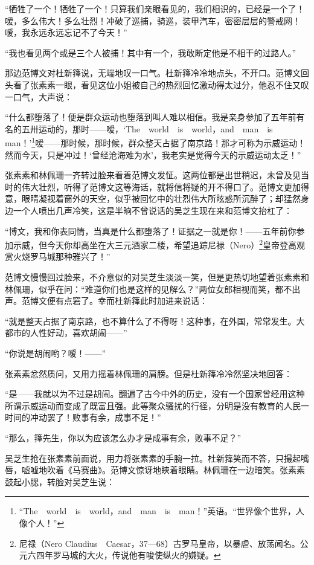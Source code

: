 \par “牺牲了一个！牺牲了一个！只算我们亲眼看见的，我们相识的，已经是一个了！嗳，多么伟大！多么壮烈！冲破了巡捕，骑巡，装甲汽车，密密层层的警戒网！嗳，我永远永远忘记不了今天！”
\par “我也看见两个或是三个人被捕！其中有一个，我敢断定他是不相干的过路人。”
\par 那边范博文对杜新箨说，无端地叹一口气。杜新箨冷冷地点头，不开口。范博文回头看了张素素一眼，看见这位小姐被自己的热烈回忆激动得太过分，他忍不住又叹一口气，大声说：
\par “什么都堕落了！便是群众运动也堕落到叫人难以相信。我是亲身参加了五年前有名的五卅运动的，那时——嗳，‘The　world　is　world，and　man　is　man！’\footnote{“The　world　is　world，and　man　is　man！”英语。“世界像个世界，人像个人！”}嗳——那时候，那时候，群众整天占据了南京路！那才可称为示威运动！然而今天，只是冲过！‘曾经沧海难为水’，我老实是觉得今天的示威运动太乏！”
\par 张素素和林佩珊一齐转过脸来看着范博文发怔。这两位都是出世稍迟，未曾及见当时的伟大壮烈，听得了范博文这等海话，就将信将疑的开不得口了。范博文更加得意，眼睛凝视着窗外的天空，似乎被回忆中的壮烈伟大所眩惑所沉醉了；却猛然身边一个人喷出几声冷笑，这是半晌不曾说话的吴芝生现在来和范博文抬杠了：
\par “博文，我和你表同情，当真是什么都堕落了！证据之一就是你！——五年前你参加示威，但今天你却高坐在大三元酒家二楼，希望追踪尼禄（Nero）\footnote{尼禄（Nero Claudius　Caesar，37—68）古罗马皇帝，以暴虐、放荡闻名。公元六四年罗马城的大火，传说他有唆使纵火的嫌疑。}皇帝登高观赏火烧罗马城那种雅兴了！”
\par 范博文慢慢回过脸来，不介意似的对吴芝生淡淡一笑，但是更热切地望着张素素和林佩珊，似乎在问：“难道你们也是这样的见解么？”两位女郎相视而笑，都不出声。范博文便有点窘了。幸而杜新箨此时加进来说话：
\par “就是整天占据了南京路，也不算什么了不得呀！这种事，在外国，常常发生。大都市的人性好动，喜欢胡闹——”
\par “你说是胡闹哟？嗳！——”
\par 张素素忿然质问，又用力摇着林佩珊的肩膀。但是杜新箨冷冷然坚决地回答：
\par “是——我就以为不过是胡闹。翻遍了古今中外的历史，没有一个国家曾经用这种所谓示威运动而变成了既富且强。此等聚众骚扰的行径，分明是没有教育的人民一时间的冲动罢了！败事有余，成事不足！”
\par “那么，箨先生，你以为应该怎么办才是成事有余，败事不足？”
\par 吴芝生抢在张素素前面说，用力将张素素的手腕一拉。杜新箨笑而不答，只撮起嘴唇，嘘嘘地吹着《马赛曲》。范博文惊讶地鿃着眼睛。林佩珊在一边暗笑。张素素鼓起小腮，转脸对吴芝生说：
